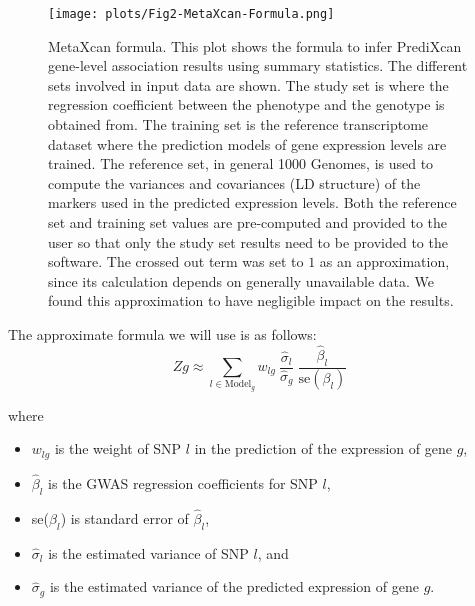 \documentclass[10pt]{article}
\begin{document}
\begin{figure}
\begin{center}
\texttt{[image: plots/Fig2-MetaXcan-Formula.png]}
\caption{MetaXcan formula. This plot shows the formula to infer PrediXcan gene-level association results using summary statistics. The different sets involved in input data are shown. The study set is where the regression coefficient between the phenotype and the genotype is obtained from. The training set is the reference transcriptome dataset where the prediction models of gene expression levels are trained. The reference set, in general 1000 Genomes, is used to compute the variances and covariances (LD structure) of the markers used in the predicted expression levels. Both the reference set and training set values are pre-computed and provided to the user so that only the study set results need to be provided to the software. The crossed out term was set to $1$ as an approximation, since its calculation depends on generally unavailable data. We found this approximation to have negligible impact on the results.} %
\label{fig:metaxcan-formula}
\end{center}
\end{figure}

The approximate formula we will use is as follows:
\begin{equation}
Zg \approx \sum_{l\in \text{Model}_g} w_{lg} ~\frac{\hat\sigma_l}{\hat\sigma_g} ~  \frac{\hat\beta_l}{\text{se}(\beta_l)} 
\end{equation}

where

\begin{itemize}
\item $w_{lg}$ is the weight of SNP $l$ in the prediction of the expression of gene $g$,
\item $\hat\beta_l$ is the GWAS regression coefficients for SNP $l$,
\item se($\beta_l$) is standard error of $\hat\beta_l$,
\item $\hat\sigma_l$ is the estimated variance of SNP $l$, and
\item $\hat\sigma_g$ is the estimated variance of the predicted expression of gene $g$.
\end{itemize}
\end{document}
